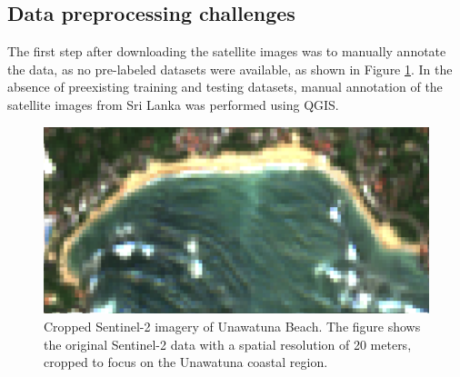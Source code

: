 \documentclass[a4paper,12pt]{article}
\begin{document}
\subsection{Data preprocessing challenges}
The first step after downloading the satellite images was to manually annotate the data, as no pre-labeled datasets were available, as shown in Figure \ref{fig:sentinel_una}. In the absence of preexisting training and testing datasets, manual annotation of the satellite images from Sri Lanka was performed using QGIS. \\
\begin{figure}[H]
    \centering
    \includegraphics[width=0.8\linewidth]{Unawantuna_Copernicushub/Screenshot 2024-12-11 at 18.19.48.png}
    \caption[Cropped Sentinel-2 imagery of Unawatuna Beach]{Cropped Sentinel-2 imagery of Unawatuna Beach. The figure shows the original Sentinel-2 data with a spatial resolution of 20 meters, cropped to focus on the Unawatuna coastal region.}
    \label{fig:sentinel_una}
\end{figure}
\end{document}

